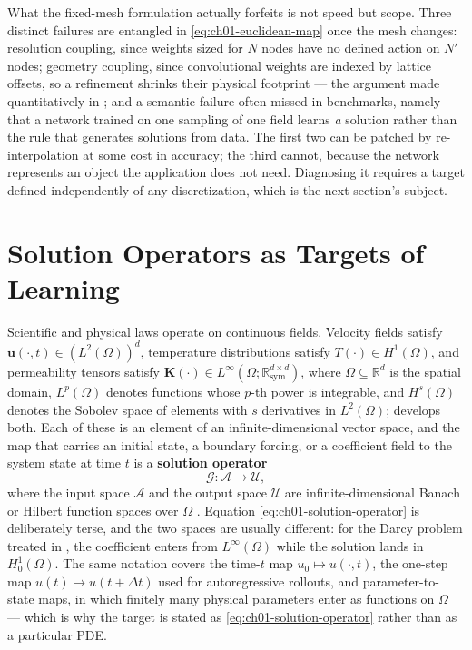 What the fixed-mesh formulation actually forfeits is not speed but scope. Three distinct
failures are entangled in \eqref{eq:ch01-euclidean-map} once the mesh changes: resolution
coupling, since weights sized for $N$ nodes have no defined action on $N'$ nodes; geometry
coupling, since convolutional weights are indexed by lattice offsets, so a refinement shrinks
their physical footprint --- the argument made quantitatively in
; and a semantic failure often missed in
benchmarks, namely that a network trained on one sampling of one field learns \emph{a}
solution rather than the rule that generates solutions from data.
The first two can be patched by re-interpolation at some cost in accuracy; the third cannot,
because the network represents an object the application does not need. Diagnosing
it requires a target defined independently of any discretization, which is the next
section's subject.

\section{Solution Operators as Targets of Learning}

Scientific and physical laws operate on continuous fields. Velocity fields satisfy
$\mathbf{u}(\cdot, t) \in (L^{2}(\Omega))^{d}$, temperature distributions satisfy
$T(\cdot) \in H^{1}(\Omega)$, and permeability tensors satisfy
$\mathbf{K}(\cdot) \in L^{\infty}(\Omega; \mathbb{R}_{\text{sym}}^{d \times d})$, where
$\Omega \subseteq \mathbb{R}^{d}$ is the spatial domain, $L^{p}(\Omega)$ denotes functions
whose $p$-th power is integrable, and $H^{s}(\Omega)$ denotes the Sobolev space of elements
with $s$ derivatives in $L^{2}(\Omega)$; 
develops both. Each of these is an element of an infinite-dimensional vector space, and the
map that carries an initial state, a boundary forcing, or a coefficient field to the system
state at time $t$ is a \textbf{solution operator}
\begin{equation}
  \label{eq:ch01-solution-operator}
  \mathcal{G} : \mathcal{A} \longrightarrow \mathcal{U},
\end{equation}
where the input space $\mathcal{A}$ and the
output space $\mathcal{U}$ are infinite-dimensional Banach or Hilbert function
spaces over $\Omega$
\cite{kovachki2023neural, stuart2010inverse}. Equation \eqref{eq:ch01-solution-operator} is
deliberately terse, and the two spaces are usually different: for the Darcy problem treated
in , the coefficient enters from
$L^{\infty}(\Omega)$ while the solution lands in $H^{1}_{0}(\Omega)$. The same notation covers
the time-$t$ map $u_{0} \mapsto u(\cdot, t)$, the one-step map
$u(t) \mapsto u(t + \Delta t)$ used for autoregressive rollouts, and parameter-to-state maps,
in which finitely many physical parameters enter as functions on $\Omega$ --- which is why the
target is stated as \eqref{eq:ch01-solution-operator} rather than as a
particular PDE.

